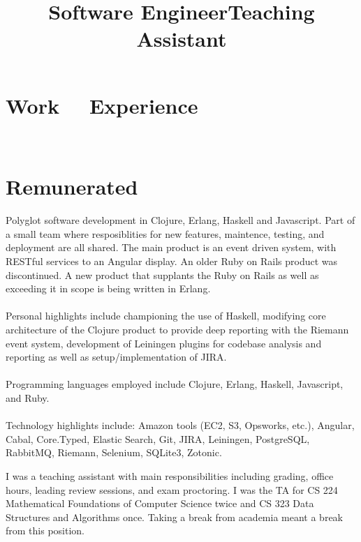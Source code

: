 \documentclass[margintitle,line]{res}
\renewcommand{\subsection}[1]{\section{\normalfont #1}}
\begin{document}
\begin{resume}
\section{Work \ \ Experience}
\ \\
\subsection{Remunerated}

\title{Software Engineer}
\begin{position}
  Polyglot software development in Clojure, Erlang, Haskell and Javascript.
  Part of a small team where resposiblities for new
  features, maintence, testing, and deployment are all shared. The
  main product is an event driven system, with RESTful services to
  an Angular display. An older Ruby on Rails product was discontinued.
  A new product that supplants the Ruby on Rails as well as exceeding it in scope
  is being written in Erlang. \\ \ \\
  Personal highlights include championing the use of Haskell, modifying core
  architecture of the Clojure product to provide deep reporting with the Riemann
  event system, development of Leiningen plugins for codebase analysis and reporting
  as well as setup/implementation of JIRA.\\ \ \\
 Programming languages employed include Clojure, Erlang, Haskell, Javascript,
 and Ruby. \\ \ \\
 Technology highlights include: Amazon tools (EC2, S3, Opsworks, etc.),
 Angular, Cabal, Core.Typed, Elastic Search, Git, JIRA, Leiningen,
 PostgreSQL, RabbitMQ, Riemann, Selenium, SQLite3, Zotonic.
\end{position}

\title{Teaching Assistant}
\begin{position}
 I was a teaching assistant with main responsibilities including
 grading, office hours, leading review sessions, and exam
 proctoring. I was the TA for CS 224 Mathematical Foundations of
 Computer Science twice and CS 323 Data Structures and Algorithms
 once. Taking a break from academia meant a break from this position.
\end{position}


\end{resume}
\end{document}
